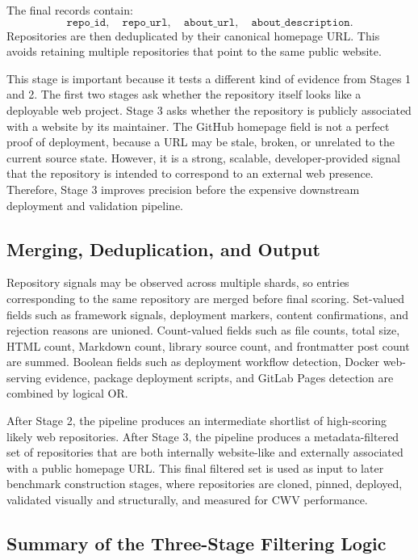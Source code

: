 The final records contain:
\[
\texttt{repo\_id},\quad \texttt{repo\_url},\quad \texttt{about\_url},\quad \texttt{about\_description}.
\]
Repositories are then deduplicated by their canonical homepage URL. This avoids retaining multiple repositories that point to the same public website.

This stage is important because it tests a different kind of evidence from Stages 1 and 2. The first two stages ask whether the repository itself looks like a deployable web project. Stage 3 asks whether the repository is publicly associated with a website by its maintainer. The GitHub homepage field is not a perfect proof of deployment, because a URL may be stale, broken, or unrelated to the current source state. However, it is a strong, scalable, developer-provided signal that the repository is intended to correspond to an external web presence. Therefore, Stage 3 improves precision before the expensive downstream deployment and validation pipeline.

\subsection{Merging, Deduplication, and Output}

Repository signals may be observed across multiple shards, so entries corresponding to the same repository are merged before final scoring. Set-valued fields such as framework signals, deployment markers, content confirmations, and rejection reasons are unioned. Count-valued fields such as file counts, total size, HTML count, Markdown count, library source count, and frontmatter post count are summed. Boolean fields such as deployment workflow detection, Docker web-serving evidence, package deployment scripts, and GitLab Pages detection are combined by logical OR.

After Stage 2, the pipeline produces an intermediate shortlist of high-scoring likely web repositories. After Stage 3, the pipeline produces a metadata-filtered set of repositories that are both internally website-like and externally associated with a public homepage URL. This final filtered set is used as input to later benchmark construction stages, where repositories are cloned, pinned, deployed, validated visually and structurally, and measured for CWV performance.

\subsection{Summary of the Three-Stage Filtering Logic}

